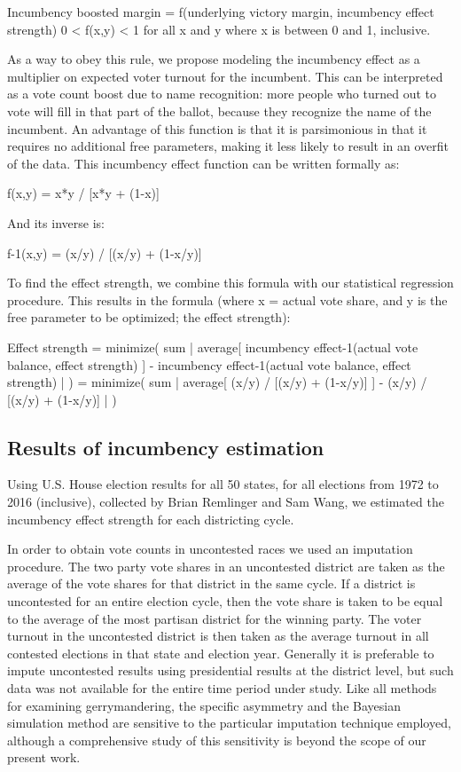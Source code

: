 \documentclass[preprint,12pt]{article}
\begin{document}
Incumbency boosted margin = f(underlying victory margin, incumbency effect strength)
0 < f(x,y) < 1 for all x and y where x is between 0 and 1, inclusive.

As a way to obey this rule, we propose modeling the incumbency effect as a multiplier on expected voter turnout for the incumbent.  This can be interpreted as a vote count boost due to name recognition: more people who turned out to vote will fill in that part of the ballot, because they recognize the name of the incumbent.  An advantage of this function is that it is parsimonious in that it requires no additional free parameters, making it less likely to result in an overfit of the data.  This incumbency effect function can be written formally as:

f(x,y) = x*y / [x*y + (1-x)]

And its inverse is:

f-1(x,y) = (x/y) / [(x/y) + (1-x/y)]


To find the effect strength, we combine this formula with our statistical regression procedure.  This results in the formula (where x = actual vote share, and y is the free parameter to be optimized; the effect strength):

Effect strength
= minimize( sum | average[ incumbency effect-1(actual vote balance, effect strength) ] - incumbency effect-1(actual vote balance, effect strength) | )
= minimize( sum | average[ (x/y) / [(x/y) + (1-x/y)] ] - (x/y) / [(x/y) + (1-x/y)] | )

\subsection{Results of incumbency estimation}

Using U.S. House election results for all 50 states, for all elections from 1972 to 2016 (inclusive), collected by Brian Remlinger and Sam Wang, we estimated the incumbency effect strength for each districting cycle.  

In order to obtain vote counts in uncontested races we used an imputation procedure. The two party vote shares in an uncontested district are taken as the average of the vote shares for that district in the same cycle. If a district is uncontested for an entire election cycle, then the vote share is taken to be equal to the average of the most partisan district for the winning party. The voter turnout in the uncontested district is then taken as the average turnout in all contested elections in that state and election year. Generally it is preferable to impute uncontested results using presidential results at the district level, but such data was not available for the entire time period under study. Like all methods for examining gerrymandering, the specific asymmetry and the Bayesian simulation method are sensitive to the particular imputation technique employed, although a comprehensive study of this sensitivity is beyond the scope of our present work.
\end{document}
